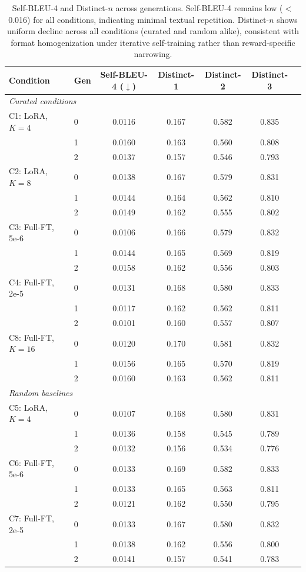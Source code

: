 \begin{table}[t]
\centering
\small
\caption{Self-BLEU-4 and Distinct-$n$ across generations. Self-BLEU-4 remains low ($<$0.016) for all conditions, indicating minimal textual repetition. Distinct-$n$ shows uniform decline across all conditions (curated and random alike), consistent with format homogenization under iterative self-training rather than reward-specific narrowing.}
\label{tab:lexical_diversity}
\begin{tabular}{@{}llccccc@{}}
\toprule
Condition & Gen & Self-BLEU-4 ($\downarrow$) & Distinct-1 & Distinct-2 & Distinct-3 \\
\midrule
\multicolumn{6}{l}{\textit{Curated conditions}} \\
\midrule
C1: LoRA, $K{=}4$
  & 0 & 0.0116 & 0.167 & 0.582 & 0.835 \\
  & 1 & 0.0160 & 0.163 & 0.560 & 0.808 \\
  & 2 & 0.0137 & 0.157 & 0.546 & 0.793 \\
\midrule
C2: LoRA, $K{=}8$
  & 0 & 0.0138 & 0.167 & 0.579 & 0.831 \\
  & 1 & 0.0144 & 0.164 & 0.562 & 0.810 \\
  & 2 & 0.0149 & 0.162 & 0.555 & 0.802 \\
\midrule
C3: Full-FT, 5e-6
  & 0 & 0.0106 & 0.166 & 0.579 & 0.832 \\
  & 1 & 0.0144 & 0.165 & 0.569 & 0.819 \\
  & 2 & 0.0158 & 0.162 & 0.556 & 0.803 \\
\midrule
C4: Full-FT, 2e-5
  & 0 & 0.0131 & 0.168 & 0.580 & 0.833 \\
  & 1 & 0.0117 & 0.162 & 0.562 & 0.811 \\
  & 2 & 0.0101 & 0.160 & 0.557 & 0.807 \\
\midrule
C8: Full-FT, $K{=}16$
  & 0 & 0.0120 & 0.170 & 0.581 & 0.832 \\
  & 1 & 0.0156 & 0.165 & 0.570 & 0.819 \\
  & 2 & 0.0160 & 0.163 & 0.562 & 0.811 \\
\midrule
\multicolumn{6}{l}{\textit{Random baselines}} \\
\midrule
C5: LoRA, $K{=}4$
  & 0 & 0.0107 & 0.168 & 0.580 & 0.831 \\
  & 1 & 0.0136 & 0.158 & 0.545 & 0.789 \\
  & 2 & 0.0132 & 0.156 & 0.534 & 0.776 \\
\midrule
C6: Full-FT, 5e-6
  & 0 & 0.0133 & 0.169 & 0.582 & 0.833 \\
  & 1 & 0.0133 & 0.165 & 0.563 & 0.811 \\
  & 2 & 0.0121 & 0.162 & 0.550 & 0.795 \\
\midrule
C7: Full-FT, 2e-5
  & 0 & 0.0133 & 0.167 & 0.580 & 0.832 \\
  & 1 & 0.0138 & 0.162 & 0.556 & 0.800 \\
  & 2 & 0.0141 & 0.157 & 0.541 & 0.783 \\
\bottomrule
\end{tabular}
\end{table}

